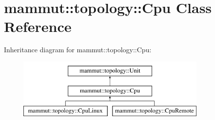 \hypertarget{classmammut_1_1topology_1_1Cpu}{\section{mammut\-:\-:topology\-:\-:Cpu Class Reference}
\label{classmammut_1_1topology_1_1Cpu}
}
Inheritance diagram for mammut\-:\-:topology\-:\-:Cpu\-:\begin{figure}[H]
\begin{center}
\leavevmode
\includegraphics[height=3.000000cm]{classmammut_1_1topology_1_1Cpu}
\end{center}
\end{figure}
